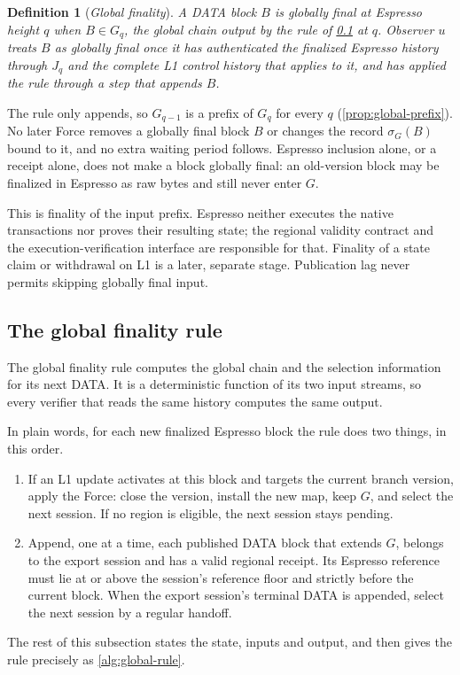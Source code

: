 \documentclass[11pt,a4paper]{article}
\newcommand{\defterm}[1]{\textcolor{rrBlue}{\textit{#1}}}
\newtheorem{definition}{Definition}[section]
\begin{document}
\begin{definition}[\defterm{Global finality}]
\label{def:global-finality}
A DATA block $B$ is \defterm{globally final at Espresso height $q$} when
$B\in G_q$, the global chain output by the rule of \cref{sec:exports} at
$q$. Observer $u$ treats $B$ as globally final once it has authenticated
the finalized Espresso history through $J_q$ and the complete L1 control
history that applies to it, and has applied the rule through a step that
appends $B$.
\end{definition}

The rule only appends, so $G_{q-1}$ is a prefix of $G_q$ for every $q$
(\cref{prop:global-prefix}). No later Force removes a globally final
block $B$ or changes the record $\sigma_G(B)$ bound to it, and no extra waiting period
follows. Espresso inclusion alone, or a receipt alone, does not make a
block globally final: an old-version block may be finalized in Espresso
as raw bytes and still never enter $G$.

This is finality of the input prefix. Espresso neither executes the
native transactions nor proves their resulting state; the regional
validity contract and the execution-verification interface are
responsible for that. Finality of a state claim or withdrawal on L1 is a
later, separate stage. Publication lag never permits skipping globally
final input.

\subsection{The global finality rule}
\label{sec:exports}
The global finality rule computes the global chain and the selection
information for its next DATA. It is a deterministic function of its
two input streams, so every verifier that reads the same history
computes the same output.

In plain words, for each new finalized Espresso block the rule does two
things, in this order.
\begin{enumerate}[label=(\arabic*),itemsep=1pt]
\item If an L1 update activates at this block and targets the current
branch version, apply the Force: close the version, install the new map,
keep $G$, and select the next session. If no region is eligible, the
next session stays pending.
\item Append, one at a time, each published DATA block that extends
$G$, belongs to the export session and has a valid regional receipt.
Its Espresso reference must lie at or above the session's reference
floor and strictly before the current block. When the export session's
terminal DATA is appended, select the next session by a regular
handoff.
\end{enumerate}
The rest of this subsection states the state, inputs and output, and
then gives the rule precisely as \cref{alg:global-rule}.
\end{document}
